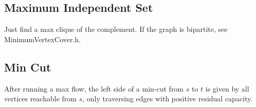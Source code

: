 \subsection{Maximum Independent Set}
Just find a max clique of the complement. If the graph is bipartite, see MinimumVertexCover.h.

\subsection{Min Cut}
After running a max flow, the left side of a min-cut from $s$ to $t$ is given by all vertices reachable from $s$, only traversing edges with positive residual capacity.